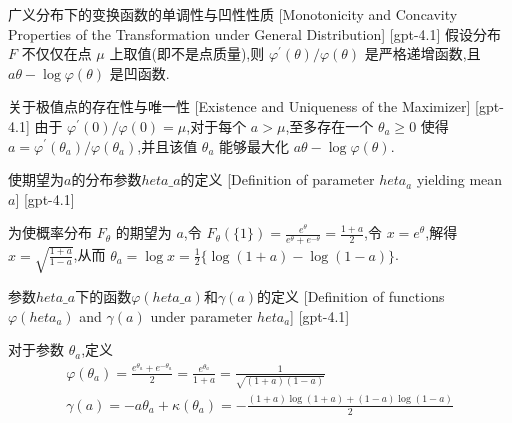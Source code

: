 \documentclass[UTF8]{ctexart}
\begin{document}
    \begin{ppt}
        {广义分布下的变换函数的单调性与凹性性质}
        [Monotonicity and Concavity Properties of the Transformation under General Distribution]
        [gpt-4.1]
        假设分布 $F$ 不仅仅在点 $\mu$ 上取值(即不是点质量),则 $\varphi^{ \prime }( \theta ) / \varphi( \theta )$ 是严格递增函数,且 $a \theta - \log \varphi( \theta )$ 是凹函数.
    \end{ppt}
    
    
    
    \begin{crl}
        {关于极值点的存在性与唯一性}
        [Existence and Uniqueness of the Maximizer]
        [gpt-4.1]
        由于 $\varphi^{ \prime }( 0 ) / \varphi( 0 ) = \mu$,对于每个 $a > \mu$,至多存在一个 $\theta_{ a } \geq 0$ 使得 $a = \varphi^{ \prime }( \theta_{ a } ) / \varphi( \theta_{ a } )$,并且该值 $\theta_{ a }$ 能够最大化 $a \theta - \log \varphi( \theta )$.
    \end{crl}
    
    
    
    \begin{dfn}
        {使期望为$a$的分布参数$	heta\_a$的定义}
        [Definition of parameter $	heta_a$ yielding mean $a$]
        [gpt-4.1]
        
为使概率分布 $F_\theta$ 的期望为 $a$,令 $F_\theta(\{1\}) = \frac{e^{\theta}}{e^{\theta} + e^{-\theta}} = \frac{1+a}{2}$,令 $x = e^{\theta}$,解得 $x = \sqrt{\frac{1+a}{1-a}}$,从而 $\theta_a = \log x = \frac{1}{2} \{ \log(1+a) - \log(1-a) \}$.

    \end{dfn}
    
    
    
    \begin{dfn}
        {参数$	heta\_a$下的函数$\varphi(	heta\_a)$和$\gamma(a)$的定义}
        [Definition of functions $\varphi(	heta_a)$ and $\gamma(a)$ under parameter $	heta_a$]
        [gpt-4.1]
        
对于参数 $\theta_a$,定义
\[
\begin{array}{l}
\displaystyle \varphi(\theta_a) = \frac{e^{\theta_a} + e^{-\theta_a}}{2} = \frac{e^{\theta_a}}{1+a} = \frac{1}{\sqrt{(1+a)(1-a)}} \\
\displaystyle \gamma(a) = -a\theta_a + \kappa(\theta_a) = -\frac{(1+a)\log(1+a) + (1-a)\log(1-a)}{2}
\end{array}
\]

    \end{dfn}
    
\end{document}
